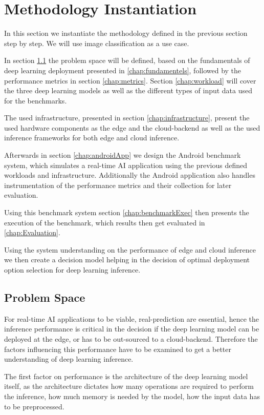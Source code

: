 \chapter{Methodology Instantiation}
\label{chap:experiments}
In this section we instantiate the methodology defined in the previous section step by step.
We will use image classification as a use case.

In section \ref{chap:problemSpace} the problem space will be defined, based on the fundamentals of deep learning deployment presented in \ref{chap:fundamentels}, followed by the performance metrics in section \ref{chap:metrics}.
Section \ref{chap:workload} will cover the three deep learning models as well as the different types of input data used for the benchmarks.

The used infrastructure, presented in section \ref{chap:infrastructure}, present the used hardware components as the edge and the cloud-backend as well as the used inference frameworks for both edge and cloud inference.

Afterwards in section \ref{chap:androidApp} we design the Android benchmark system, which simulates a real-time AI application using the previous defined workloads and infrastructure. Additionally the Android application also handles instrumentation of the performance metrics and their collection for later evaluation.

Using this benchmark system section \ref{chap:benchmarkExec} then presents the execution of the benchmark, which results then get evaluated in \ref{chap:Evaluation}.

Using the system understanding on the performance of edge and cloud inference we then create a decision model helping in the decision of optimal deployment option selection for deep learning inference.


\section{Problem Space}
\label{chap:problemSpace}
For real-time AI applications to be viable, real-prediction are essential, hence the inference performance is critical in the decision if the deep learning model can be deployed at the edge, or has to be out-sourced to a cloud-backend.
Therefore the factors influencing this performance have to be examined to get a better understanding of deep learning inference.

The first factor on performance is the architecture of the deep learning model itself, as the architecture dictates how many operations are required to perform the inference, how much memory is needed by the model, how the input data has to be preprocessed.


